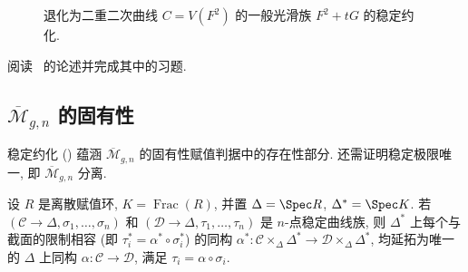 \begin{figure}[H]\centering
\caption{退化为二重二次曲线 $C=V(F^2)$ 的一般光滑族 $F^2+tG$ 的稳定约化.}\label{src:6.5.18}
\end{figure}
\begin{exercise}[元习题]\label{src:6.5.19}
阅读~\cite[\S3.C]{HM98} 的论述并完成其中的习题.
\end{exercise}
\subsection{\texorpdfstring{$\overline{\mathcal M}_{g,\allowbreak n}$ 的固有性}{稳定曲线模叠 的固有性}}\label{src:6.5.3-subsection}
稳定约化 () 蕴涵 $\overline{\mathcal M}_{g,\allowbreak n}$ 的固有性赋值判据中的存在性部分. 还需证明稳定极限唯一, 即 $\overline{\mathcal M}_{g,\allowbreak n}$ 分离.
\begin{proposition}\label{src:6.5.20}
设 $R$ 是离散赋值环, $K=\operatorname{Frac}(R)$, 并置 $\Delta=\Spec R$, $\Delta^*=\Spec K$. 若 $(\mathcal C\to\Delta,\allowbreak \sigma_1,\allowbreak \ldots,\allowbreak \sigma_n)$ 和 $(\mathcal D\to\Delta,\allowbreak \tau_1,\allowbreak \ldots,\allowbreak \tau_n)$ 是 $n$-点稳定曲线族, 则 $\Delta^*$ 上每个与截面的限制相容 (即 $\tau_i^*=\alpha^*\circ\sigma_i^*$) 的同构 $\alpha^*:\mathcal C\times_\Delta\Delta^*\to\mathcal D\times_\Delta\Delta^*$, 均延拓为唯一的 $\Delta$ 上同构 $\alpha:\mathcal C\to\mathcal D$, 满足 $\tau_i=\alpha\circ\sigma_i$.
\end{proposition}
